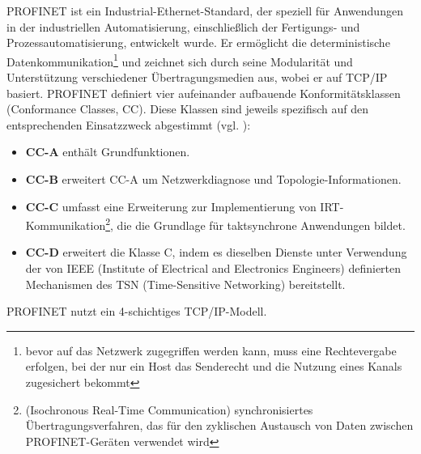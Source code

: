 PROFINET ist ein Industrial-Ethernet-Standard, der speziell für Anwendungen in der industriellen Automatisierung, einschließlich der Fertigungs- und Prozessautomatisierung, entwickelt wurde. Er ermöglicht die deterministische Datenkommunikation\footnote{bevor auf das Netzwerk zugegriffen werden kann, muss eine Rechtevergabe erfolgen, bei der nur ein Host das Senderecht und die Nutzung eines Kanals zugesichert bekommt} und zeichnet sich durch seine Modularität und Unterstützung verschiedener Übertragungsmedien aus, wobei er auf TCP/IP basiert. PROFINET definiert vier aufeinander aufbauende Konformitätsklassen (Conformance Classes, CC). Diese Klassen sind jeweils spezifisch auf den entsprechenden Einsatzzweck abgestimmt (vgl. \cite{IPInsider}):

\begin{itemize}
\item \textbf{CC-A} enthält Grundfunktionen.
\item \textbf{CC-B} erweitert CC-A um Netzwerkdiagnose und Topologie-Informationen.
\item \textbf{CC-C} umfasst eine Erweiterung zur Implementierung von IRT-Kommunikation\footnote{(Isochronous Real-Time Communication) synchronisiertes Übertragungsverfahren, das für den zyklischen Austausch von Daten zwischen PROFINET-Geräten verwendet wird}, die die Grundlage für taktsynchrone Anwendungen bildet.
\item \textbf{CC-D} erweitert die Klasse C, indem es dieselben Dienste unter Verwendung der von IEEE (Institute of Electrical and Electronics Engineers) definierten Mechanismen des TSN (Time-Sensitive Networking) bereitstellt.
\end{itemize} PROFINET nutzt ein 4-schichtiges TCP/IP-Modell. 
